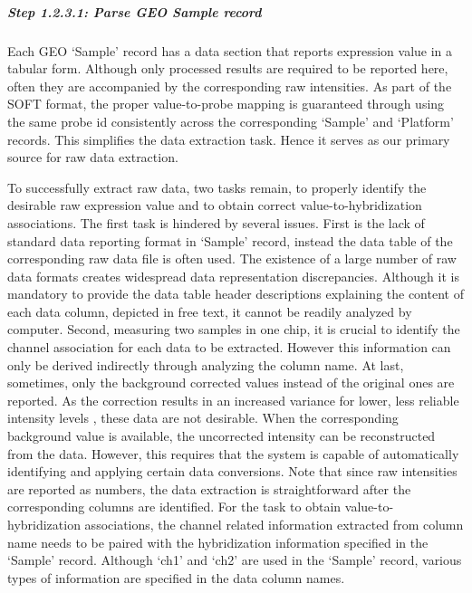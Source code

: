 \subparagraph{\textit{Step 1.2.3.1: Parse GEO Sample record}}
Each GEO `Sample' record has a data section that reports expression value in a
tabular form.
%
Although only processed results are required to be reported here, often they
are accompanied by the corresponding raw intensities.
%
As part of the SOFT format, the proper value-to-probe mapping is guaranteed
through using the same probe id consistently across the corresponding `Sample'
and `Platform' records.
%
This simplifies the data extraction task. 
%
Hence it serves as our primary source for raw data extraction.

To successfully extract raw data, two tasks remain, to properly identify the
desirable raw expression value and to obtain correct value-to-hybridization
associations.
%
The first task is hindered by several issues. 
%
First is the lack of standard data reporting format in `Sample' record,
instead the data table of the corresponding raw data file is often used.
%
The existence of a large number of raw data formats creates widespread data
representation discrepancies.
%
Although it is mandatory to provide the data table header descriptions
explaining the content of each data column, depicted in free text, it cannot
be readily analyzed by computer.
%
Second, measuring two samples in one chip, it is crucial to identify the
channel association for each data to be extracted.  However this information
can only be derived indirectly through analyzing the column name.
%
At last, sometimes, only the background corrected values instead of the
original ones are reported.  As the correction results in an increased
variance for lower, less reliable intensity levels \cite{Ritchie2007}, these
data are not desirable.
%
When the corresponding background value is available, the uncorrected
intensity can be reconstructed from the data.  However, this requires that the
system is capable of automatically identifying and applying certain data
conversions.
%
Note that since raw intensities are reported as numbers, the data extraction
is straightforward after the corresponding columns are identified.
%
For the task to obtain value-to-hybridization associations, the channel
related information extracted from column name needs to be paired with the
hybridization information specified in the `Sample' record.
%
Although `ch1' and `ch2' are used in the `Sample' record, various types of
information are specified in the data column names.

